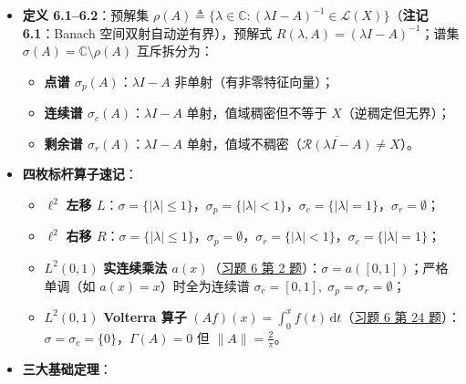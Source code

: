 \documentclass[11pt,a4paper]{article}
\providecommand{\tightlist}{\setlength{\itemsep}{1.8pt}\setlength{\parskip}{0pt}}
\begin{document}
\begin{itemize}
\tightlist
\item
  \textbf{定义 6.1--6.2}：预解集 \(\rho(A)\triangleq\{\lambda\in\mathbb{C}:(\lambda I-A)^{-1}\in\mathcal{L}(X)\}\)（\textbf{注记 6.1}：Banach 空间双射自动逆有界），预解式 \(R(\lambda,A)=(\lambda I-A)^{-1}\)；谱集 \(\sigma(A)=\mathbb{C}\setminus\rho(A)\) 互斥拆分为：

  \begin{itemize}
  \tightlist
  \item
    \textbf{点谱 \(\sigma_p(A)\)}：\(\lambda I-A\) 非单射（有非零特征向量）；
  \item
    \textbf{连续谱 \(\sigma_c(A)\)}：\(\lambda I-A\) 单射，值域稠密但不等于 \(X\)（逆稠定但无界）；
  \item
    \textbf{剩余谱 \(\sigma_r(A)\)}：\(\lambda I-A\) 单射，值域不稠密（\(\overline{\mathcal{R}(\lambda I-A)}\neq X\)）。
  \end{itemize}
\item
  \textbf{四枚标杆算子速记}：

  \begin{itemize}
  \tightlist
  \item
    \(\ell^2\) \textbf{左移 \(L\)}：\(\sigma=\{\lvert\lambda\rvert\le 1\}\)，\(\sigma_p=\{\lvert\lambda\rvert<1\}\)，\(\sigma_c=\{\lvert\lambda\rvert=1\}\)，\(\sigma_r=\emptyset\)；
  \item
    \(\ell^2\) \textbf{右移 \(R\)}：\(\sigma=\{\lvert\lambda\rvert\le 1\}\)，\(\sigma_p=\emptyset\)，\(\sigma_r=\{\lvert\lambda\rvert<1\}\)，\(\sigma_c=\{\lvert\lambda\rvert=1\}\)；
  \item
    \(L^2(0,1)\) \textbf{实连续乘法 \(a(x)\)}（\hyperlink{card:6-2}{\textcolor{LinkColor}{习题 6 第 2 题}}）：\(\sigma=a([0,1])\)；严格单调（如 \(a(x)=x\)）时全为连续谱 \(\sigma_c=[0,1],\;\sigma_p=\sigma_r=\emptyset\)；
  \item
    \(L^2(0,1)\) \textbf{Volterra 算子} \((Af)(x)=\int_0^x f(t)\,\mathrm{d}t\)（\hyperlink{card:6-24}{\textcolor{LinkColor}{习题 6 第 24 题}}）：\(\sigma=\sigma_c=\{0\}\)，\(\Gamma(A)=0\) 但 \(\lVert A\rVert=\frac{2}{\pi}\)。
  \end{itemize}
\item
  \textbf{三大基础定理}：


\end{itemize}
\end{document}
